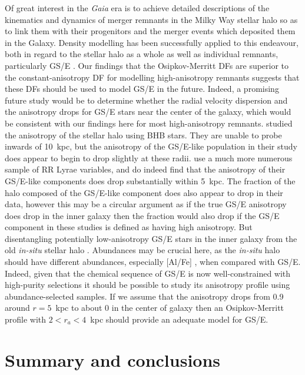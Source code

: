 Of great interest in the \textit{Gaia} era is to achieve detailed descriptions of the kinematics and dynamics of merger remnants in the Milky Way stellar halo so as to link them with their progenitors and the merger events which deposited them in the Galaxy. Density modelling has been successfully applied to this endeavour, both in regard to the stellar halo as a whole \parencite[e.g.][]{deason19,mackereth20} as well as individual remnants, particularly GS/E \parencite[e.g.][]{han22,lane23}. Our findings that the Osipkov-Merritt DFs are superior to the constant-anisotropy DF for modelling high-anisotropy remnants suggests that these DFs should be used to model GS/E in the future. Indeed, a promising future study would be to determine whether the radial velocity dispersion and the anisotropy drops for GS/E stars near the center of the galaxy, which would be consistent with our findings here for most high-anisotropy remnants. \textcite{lancaster19} studied the anisotropy of the stellar halo using BHB stars. They are unable to probe inwards of 10~kpc, but the anisotropy of the GS/E-like population in their study does appear to begin to drop slightly at these radii. \textcite{iorio21} use a much more numerous sample of RR Lyrae variables, and do indeed find that the anisotropy of their GS/E-like components does drop substantially within 5~kpc. The fraction of the halo composed of the GS/E-like component does also appear to drop in their data, however this may be a circular argument as if the true GS/E anisotropy does drop in the inner galaxy then the fraction would also drop if the GS/E component in these studies is defined as having high anisotropy. But disentangling potentially low-anisotropy GS/E stars in the inner galaxy from the old \textit{in-situ} stellar halo \parencite[e.g.][]{belokurov22,rix22}. Abundances may be crucial here, as the \textit{in-situ} halo should have different abundances, especially [Al/Fe] \parencite[see][]{belokurov22}, when compared with GS/E. Indeed, given that the chemical sequence of GS/E is now well-constrained with high-purity selections \parencite[e.g.][]{lane23} it should be possible to study its anisotropy profile using abundance-selected samples. If we assume that the anisotropy drops from 0.9 around $r=5$~kpc to about 0 in the center of galaxy then an Osipkov-Merritt profile with $2 < r_{a} < 4$~kpc should provide an adequate model for GS/E. 

\section{Summary and conclusions}
\label{ch4:sec:summary-conclusions}

